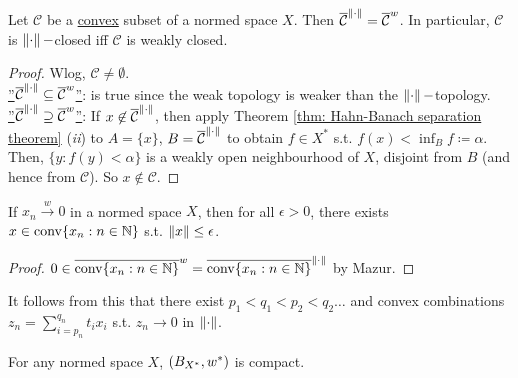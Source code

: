 \documentclass{article}
\begin{document}
\newpage
\begin{theorem}[Mazur]\label{thm: Mazur}
    Let $\mathcal{C}$ be a \noindent\underline{convex} subset of a normed space $X$. Then $\overline{\mathcal{C}}^{\left\lVert\cdot\right\rVert}=\overline{\mathcal{C}}^{w}$. In particular, $\mathcal{C}$ is $\left\lVert\cdot\right\rVert-$closed iff $\mathcal{C}$ is weakly closed.
\end{theorem}

\begin{proof}
    Wlog, $\mathcal{C}\neq \emptyset$.\\
    
    \noindent\underline{''$\overline{\mathcal{C}}^{\left\lVert\cdot\right\rVert}\subseteq\overline{\mathcal{C}}^{w}$''}: is true since the weak topology is weaker than the $\left\lVert\cdot\right\rVert-$topology.\\

    \noindent\underline{''$\overline{\mathcal{C}}^{\left\lVert\cdot\right\rVert}\supseteq\overline{\mathcal{C}}^{w}$''}: If $x\not\in \overline{\mathcal{C}}^{\left\lVert\cdot\right\rVert}$, then apply Theorem \ref{thm: Hahn-Banach separation theorem} (\textit{ii}) to $A=\{x\}$, $B = \overline{\mathcal{C}}^{\left\lVert\cdot\right\rVert}$ to obtain $f\in X^*$ s.t. $f(x)<\displaystyle\inf_{B}f \coloneqq \alpha$. Then, $\{y:f(y)<\alpha\}$ is a weakly open neighbourhood of $X$, disjoint from $B$ (and hence from $\mathcal{C}$). So $x\not\in \mathcal{C}$.
\end{proof}

\begin{boxcor}[Mazur]\label{cor: Mazur}
    If $x_n\xrightarrow{w}0$ in a normed space $X$, then for all $\epsilon>0$, there exists $x\in \operatorname{conv}\{x_n:n\in \mathbb{N}\}$ s.t. $\left\lVert x\right\rVert\leq \epsilon$.
\end{boxcor}

\begin{proof}
    $0\in \overline{\operatorname{conv}\{x_n:n\in \mathbb{N}\}}^{w}= \overline{\operatorname{conv}\{x_n:n\in \mathbb{N}\}}^{\left\lVert\cdot\right\rVert}$
    by Mazur.
\end{proof}

\begin{remark}
    It follows from this that there exist $p_1<q_1<p_2<q_2 \dots $ and convex combinations $z_n = \displaystyle\sum^{q_n}_{i=p_n}t_ix_i$ s.t. $z_n \to 0$ in $\left\lVert\cdot\right\rVert$.
\end{remark}

\begin{theorem}\label{thm: Banach-Alaoglu}
    For any normed space $X$, $(B_{X^*},w^*)$ is compact. 
\end{theorem}
\end{document}
